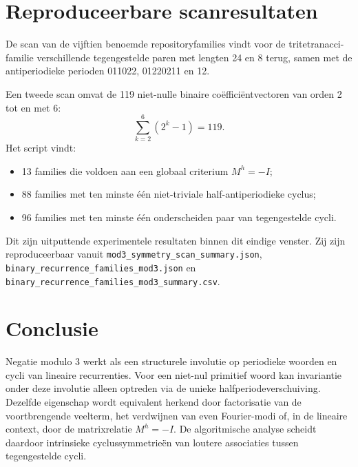 \documentclass[11pt,a4paper]{article}
\begin{document}
\section{Reproduceerbare scanresultaten}
De scan van de vijftien benoemde repositoryfamilies vindt voor de tritetranacci-familie verschillende tegengestelde paren met lengten 24 en 8 terug, samen met de antiperiodieke perioden 011022, 01220211 en 12.

Een tweede scan omvat de 119 niet-nulle binaire coëfficiëntvectoren van orden 2 tot en met 6:
\[
\sum_{k=2}^{6}(2^k-1)=119.
\]
Het script vindt:
\begin{itemize}
\item 13 families die voldoen aan een globaal criterium $M^h=-I$;
\item 88 families met ten minste één niet-triviale half-antiperiodieke cyclus;
\item 96 families met ten minste één onderscheiden paar van tegengestelde cycli.
\end{itemize}
Dit zijn uitputtende experimentele resultaten binnen dit eindige venster. Zij zijn reproduceerbaar vanuit \nolinkurl{mod3_symmetry_scan_summary.json}, \nolinkurl{binary_recurrence_families_mod3.json} en \nolinkurl{binary_recurrence_families_mod3_summary.csv}.

\section*{Conclusie}
Negatie modulo 3 werkt als een structurele involutie op periodieke woorden en cycli van lineaire recurrenties. Voor een niet-nul primitief woord kan invariantie onder deze involutie alleen optreden via de unieke halfperiodeverschuiving. Dezelfde eigenschap wordt equivalent herkend door factorisatie van de voortbrengende veelterm, het verdwijnen van even Fourier-modi of, in de lineaire context, door de matrixrelatie $M^h=-I$. De algoritmische analyse scheidt daardoor intrinsieke cyclussymmetrieën van loutere associaties tussen tegengestelde cycli.
\end{document}
